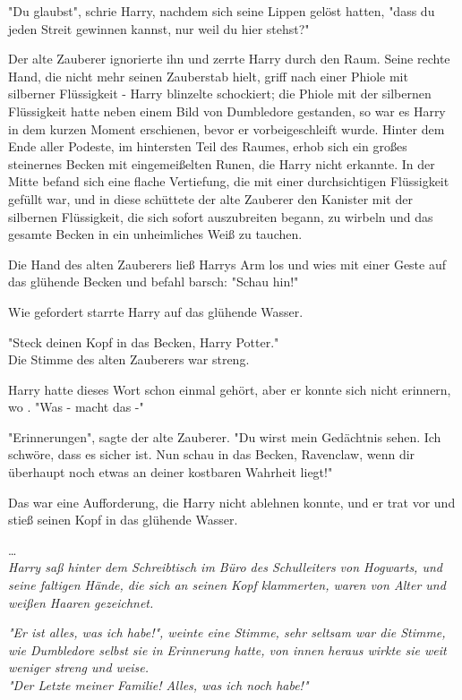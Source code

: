 {"Du glaubst", schrie Harry, nachdem sich seine Lippen gelöst hatten, "dass du jeden Streit gewinnen kannst, nur weil du hier stehst?"

Der alte Zauberer ignorierte ihn und zerrte Harry durch den Raum. Seine rechte Hand, die nicht mehr seinen Zauberstab hielt, griff nach einer Phiole mit silberner Flüssigkeit - Harry blinzelte schockiert; die Phiole mit der silbernen Flüssigkeit hatte neben einem Bild von Dumbledore gestanden, so war es Harry in dem kurzen Moment erschienen, bevor er vorbeigeschleift wurde. Hinter dem Ende aller Podeste, im hintersten Teil des Raumes, erhob sich ein großes steinernes Becken mit eingemeißelten Runen, die Harry nicht erkannte. In der Mitte befand sich eine flache Vertiefung, die mit einer durchsichtigen Flüssigkeit gefüllt war, und in diese schüttete der alte Zauberer den Kanister mit der silbernen Flüssigkeit, die sich sofort auszubreiten begann, zu wirbeln und das gesamte Becken in ein unheimliches Weiß zu tauchen.

Die Hand des alten Zauberers ließ Harrys Arm los und wies mit einer Geste auf das glühende Becken und befahl barsch: "Schau hin!"

Wie gefordert starrte Harry auf das glühende Wasser.

"Steck deinen Kopf in das Becken, Harry Potter."\\ Die Stimme des alten Zauberers war streng.

Harry hatte dieses Wort schon einmal gehört, aber er konnte sich nicht erinnern, wo . "Was - macht das -"

"Erinnerungen", sagte der alte Zauberer. "Du wirst mein Gedächtnis sehen. Ich schwöre, dass es sicher ist. Nun schau in das Becken, Ravenclaw, wenn dir überhaupt noch etwas an deiner kostbaren Wahrheit liegt!"

Das war eine Aufforderung, die Harry nicht ablehnen konnte, und er trat vor und stieß seinen Kopf in das glühende Wasser.

…\\ \emph{Harry saß hinter dem Schreibtisch im Büro des Schulleiters von Hogwarts, und seine faltigen Hände, die sich an seinen Kopf klammerten, waren von Alter und weißen Haaren gezeichnet.}

\emph{"Er ist alles, was ich habe!", weinte eine Stimme, sehr seltsam war die Stimme, wie Dumbledore selbst sie in Erinnerung hatte, von innen heraus wirkte sie weit weniger streng und weise.}\\ \emph{"Der Letzte meiner Familie! Alles, was ich noch habe!"}

}
